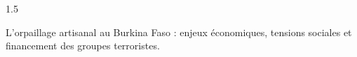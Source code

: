 \documentclass[12pt]{article}
\begin{document}
\begin{spacing}{1.5}

L'orpaillage artisanal au Burkina Faso : enjeux économiques, tensions sociales et financement des groupes terroristes.


\quad

\end{spacing}
\end{document}
